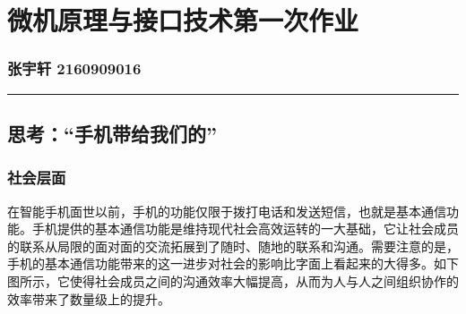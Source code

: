 \section*{微机原理与接口技术第一次作业}
    \vspace{-5pt}\subsubsection*{张宇轩 2160909016}
    \vspace{-10pt}\noindent\rule{\textwidth}{0.1pt}
    \vspace{-30pt}
    \subsection{思考：“手机带给我们的”}
        \subsubsection*{社会层面}
            在智能手机面世以前，手机的功能仅限于拨打电话和发送短信，也就是基本通信功能。手机提供的基本通信功能是维持现代社会高效运转的一大基础，它让社会成员的联系从局限的面对面的交流拓展到了随时、随地的联系和沟通。需要注意的是，手机的基本通信功能带来的这一进步对社会的影响比字面上看起来的大得多。如下图所示，它使得社会成员之间的沟通效率大幅提高，从而为人与人之间组织协作的效率带来了数量级上的提升。
            \vspace{20pt}
